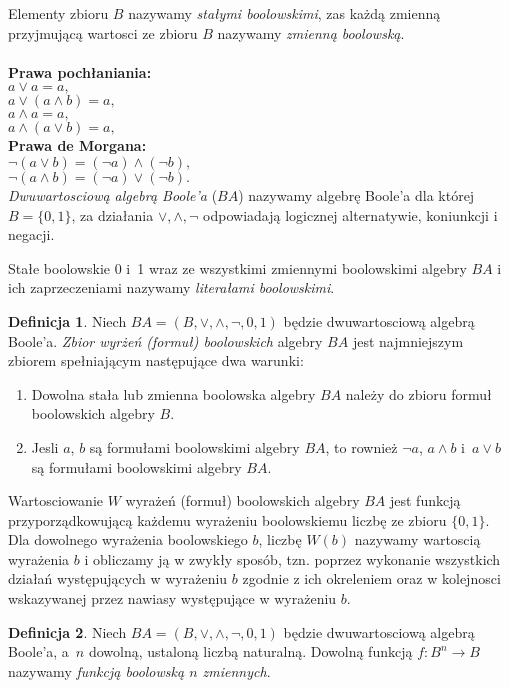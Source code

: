 \documentclass[a4paper,11pt,twoside]{article}
\theoremstyle{definition}
\newtheorem{df}{Definicja}
\begin{document}
Elementy zbioru $B$ nazywamy {\em stałymi boolowskimi}, zas każdą zmienną przyjmującą wartosci ze zbioru $B$ nazywamy {\em zmienną boolowską}.\\ \\
{\bf Prawa pochłaniania:} \\
$a \vee a = a,$\\
$a \vee (a \wedge b) = a,$\\
$a \wedge a = a,$\\
$a \wedge(a \vee b) = a,$\\
{\bf Prawa de Morgana:}\\
$\neg(a \vee b) = ({\neg}a) \wedge ({\neg}b),$\\
$\neg(a \wedge b) = ({\neg}a) \vee ({\neg}b).$\\

{\em Dwuwartosciową algebrą Boole'a} ($\mathit{BA}$) nazywamy algebrę Boole'a dla której $B=\{0,1\}$, za działania $\vee,\wedge,\neg$ odpowiadają logicznej alternatywie, koniunkcji i negacji.

Stałe boolowskie 0 i~1 wraz ze wszystkimi zmiennymi boolowskimi algebry $\mathit{BA}$ i ich zaprzeczeniami nazywamy {\em literałami boolowskimi}. 

\begin{df}
Niech $\mathit{BA} = (B,\vee,\wedge,\neg,0,1)$ będzie dwuwartosciową algebrą Boole'a. {\em Zbior wyrżeń (formuł) boolowskich}  algebry $\mathit{BA}$ jest najmniejszym zbiorem spełniającym następujące dwa warunki:
\begin{enumerate}
\item Dowolna stała lub zmienna boolowska algebry $\mathit{BA}$ należy do zbioru formuł boolowskich algebry $\mathit{B}.$
\item Jesli $a$, $b$ są formułami boolowskimi algebry $\mathit{BA}$, to rownież $\neg a$, $a \wedge b$ i~$a \vee b$ są formułami boolowskimi algebry $\mathit{BA}$.
\end{enumerate}
Wartosciowanie $W$ wyrażeń (formuł) boolowskich algebry $\mathit{BA}$ jest funkcją przyporządkowującą każdemu wyrażeniu boolowskiemu liczbę ze zbioru $\{0,1\}$. Dla dowolnego wyrażenia boolowskiego $b$, liczbę $W(b)$ nazywamy wartoscią wyrażenia $b$ i obliczamy ją w zwykły sposób, tzn. poprzez wykonanie wszystkich działań występujących w  wyrażeniu $b$ zgodnie z ich okreleniem oraz w kolejnosci wskazywanej przez nawiasy występujące w wyrażeniu $b$.
\end{df}

\begin{df}
Niech $\mathit{BA} = (B,\vee,\wedge,\neg,0,1)$ będzie dwuwartosciową algebrą Boole'a, a~$n$ dowolną, ustaloną liczbą naturalną. Dowolną funkcją $f\colon B^n \to B$ nazywamy {\em funkcją boolowską $n$ zmiennych}.
\end{df}
\end{document}
